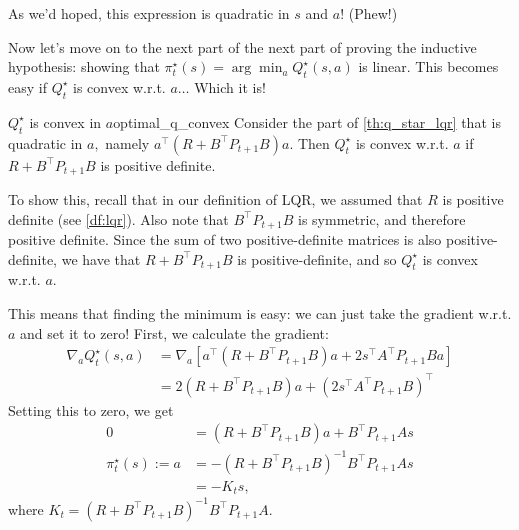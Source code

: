 \documentclass[../main/main]{subfiles}
\begin{document}
As we'd hoped, this expression is quadratic in $s$ and $a$! (Phew!)

Now let's move on to the next part of the next part of proving the inductive hypothesis:
showing that $\pi^\star_t(s) = \arg \min_a Q^\star_t(s, a)$ is linear.
This becomes easy if $Q^\star_t$ is convex w.r.t. $a\dots$ Which it is!

\begin{theorem}{$Q^\star_t$ is convex in $a$}{optimal_q_convex}
    Consider the part of \autoref{th:q_star_lqr} that is quadratic in $a,$ namely
    $a^\top (R + B^\top P_{t+1} B) a.$ Then $Q^\star_t$ is convex w.r.t. $a$
    if $R + B^\top P_{t+1} B$ is positive definite.
    
    To show this, recall that in our definition of LQR,
    we assumed that $R$ is positive definite (see \autoref{df:lqr}).
    Also note that $B^\top P_{t+1} B$ is symmetric, and therefore positive definite.
    Since the sum of two positive-definite matrices is also positive-definite,
    we have that $R + B^\top P_{t+1} B$ is positive-definite,
    and so $Q^\star_t$ is convex w.r.t. $a.$
\end{theorem}

This means that finding the minimum is easy:
we can just take the gradient w.r.t. $a$ and set it to zero!
First, we calculate the gradient:
\begin{align*}
    \nabla_a Q^\star_t(s, a) &= \nabla_a [ a^\top (R + B^\top P_{t+1} B) a + 2 s^\top A^\top P_{t+1} B a ] \\
    &= 2 (R + B^\top P_{t+1} B) a + (2 s^\top A^\top P_{t+1} B)^\top
\end{align*}
Setting this to zero, we get \begin{align}
    0 &= (R + B^\top P_{t+1} B) a + B^\top P_{t+1} A s \nonumber \\
    \pi^\star_t(s) := a &= -(R + B^\top P_{t+1} B)^{-1} B^\top P_{t+1} A s \nonumber \\
    &= - K_t s,
\end{align}
where $K_t = (R + B^\top P_{t+1} B)^{-1} B^\top P_{t+1} A.$
\end{document}
